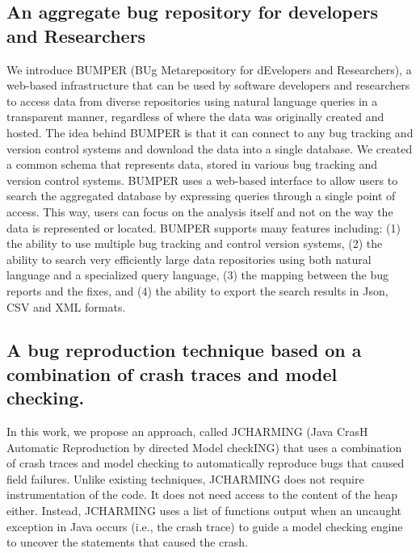\subsection{An aggregate bug  repository for  developers  and  Researchers}
We introduce BUMPER (BUg Metarepository for  dEvelopers  and  Researchers),  a  web-based  infrastructure
that  can  be  used  by  software  developers  and  researchers  to access  data  from  diverse  repositories  using  natural  language queries in a transparent manner, regardless of where the data was originally created and hosted.
The  idea  behind  BUMPER  is  that  it  can  connect  to  any bug  tracking  and  version  control  systems  and  download  the data  into  a  single  database.
We  created  a  common  schema that represents data, stored in various bug tracking and version control systems.
BUMPER uses a web-based interface to allow users to search the aggregated database by expressing queries through a single point of access.
This way, users can focus on the analysis itself and not on the way the data is represented or located.
BUMPER supports many features including: (1) the ability to use multiple bug tracking and control version systems, (2) the  ability  to  search  very  efficiently  large  data  repositories using both natural language and a specialized query language, (3)  the  mapping  between  the  bug  reports  and  the  fixes,  and (4)  the  ability  to  export  the  search  results  in  Json,  CSV  and XML formats.

\subsection{A bug reproduction technique based on a combination of crash traces and model checking.}

In this work, we propose an approach, called JCHARMING (Java CrasH Automatic Reproduction by directed Model checkING) that uses a combination of crash traces and model checking to automatically reproduce bugs that caused field failures.
Unlike existing techniques, JCHARMING does not require instrumentation of the code.
It does not need access to the content of the heap either.
Instead, JCHARMING uses a list of functions output when an uncaught exception in Java occurs (i.e., the crash trace) to guide a model checking engine to uncover the statements that caused the crash.


